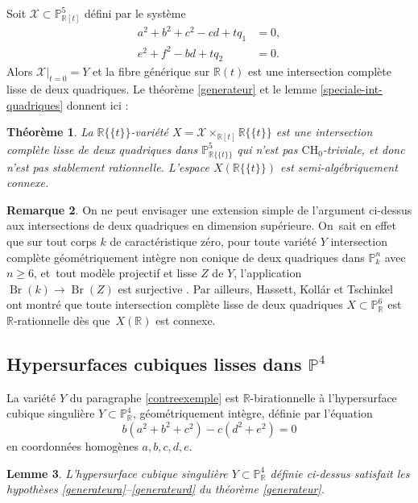 \documentclass[11pt]{article}
\newcommand{\CH}{\mathrm{CH}}
\newtheorem{thm}{Théorème}[section]
\newtheorem{lemma}[thm]{Lemme}
\theoremstyle{definition}
\newtheorem{rmk}[thm]{Remarque}
\newcommand{\R}{\mathbb R}
\renewcommand{\P}{\mathbb P}
\newcommand{\Br}{\operatorname{Br}}
\newcommand{\mc}[1]{\mathcal{#1}}
\newcommand{\puiseux}{\mathbb{R}\{\!\{t\}\!\}}
\begin{document}
Soit $\mc{X}\subset \P^5_{\R[t]}$ défini par le système
\begin{align*}
a^2+ b^2+c^2 - cd +tq_1 &=0,\\
e^2+f^2 -bd +t q_2 &=0.
\end{align*}
Alors $\mc{X}|_{t=0}=Y$ et la fibre générique sur $\R(t)$ est une intersection complète lisse de deux quadriques. Le théorème \ref{generateur} et le lemme \ref{speciale-int-quadriques} donnent ici :

\begin{thm}\label{prop-intersection-quadriques}
La $\puiseux$-variété $X= \mc{X}\times_{\R[t]} \puiseux$ est une intersection complète lisse de deux quadriques dans $\P^5_{\puiseux}$ qui n'est pas $\CH_0$-triviale, et donc n'est pas
stablement rationnelle. L'espace $X(\puiseux)$ est semi-algébriquement connexe.\end{thm}

\begin{rmk}
On ne peut envisager une extension simple de l'argument ci-dessus aux intersections de deux quadriques en dimension supérieure. On~sait en effet
que sur tout corps $k$ de caractéristique zéro, pour toute variété $Y$ intersection complète géométriquement intègre non conique de deux quadriques dans $\P^n_k$ avec $n\geq 6$, et~tout modèle projectif et lisse $Z$ de $Y$, l'application
$\Br(k) \to \Br(Z)$ est surjective \cite[Th.\,3.8]{colliot1987intersectionsI}.
Par ailleurs, Hassett, Kollár et Tschinkel
\cite{hassett2022rationality} ont montré que toute intersection complète lisse de deux quadriques $X \subset \P^6_{\R} $
est $\R$-rationnelle dès que~$X(\R)$ est connexe.
\end{rmk}

\subsection{Hypersurfaces cubiques lisses dans \texorpdfstring{$\P^4$}{P4} }\label{exemplecubique}

La variété $Y$ du paragraphe \ref{contreexemple} est $\R$-birationnelle à l'hypersurface cubique singulière $Y \subset \P^4_{\R}$, géométriquement intègre, définie
par l'équation
\begin{equation}\label{Ycub}
b(a^2+b^2+c^2) - c(d^2+e^2)=0
\end{equation}
en coordonnées homogènes $a,b,c,d,e$.

\begin{lemma}\label{cubique}
L'hypersurface cubique singulière $Y \subset \P^4_{\R}$ définie ci-dessus satisfait les hypothèses \eqref{generateura}--\eqref{generateurd} du théorème \ref{generateur}.
\end{lemma}
\end{document}
